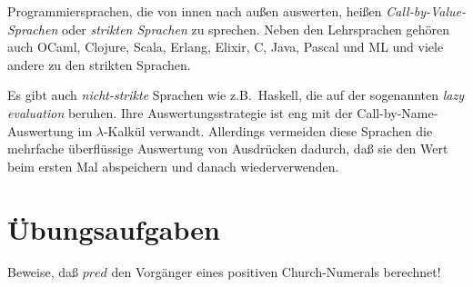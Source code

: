 Programmiersprachen, die von innen nach außen auswerten, heißen
\textit{Call-by-Value-Sprachen} oder
\textit{strikten Sprachen} zu sprechen.  Neben
den Lehrsprachen gehören auch OCaml, Clojure, Scala, Erlang, Elixir,
C, Java, Pascal und ML und viele andere zu den strikten Sprachen.

Es gibt auch \textit{nicht-strikte}
Sprachen wie z.B.\ Haskell,
die auf der sogenannten \textit{lazy evaluation} beruhen.  Ihre
Auswertungsstrategie ist eng mit der Call-by-Name-Auswertung im
$\lambda$-Kalkül verwandt.  Allerdings vermeiden diese Sprachen die
mehrfache überflüssige Auswertung von Ausdrücken dadurch, daß sie den
Wert beim ersten Mal abspeichern und danach wiederverwenden.

\section*{Übungsaufgaben}



\begin{aufgabe}\label{ex:pred}
  Beweise, daß $\mathit{pred}$ den Vorgänger eines
  positiven Church-Numerals berechnet!
\end{aufgabe}

